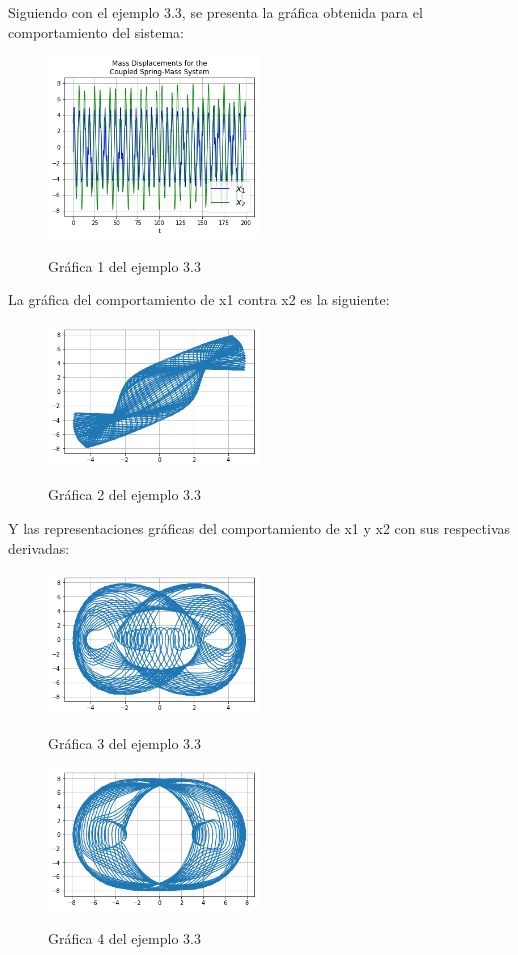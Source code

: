 \documentclass{article}
\begin{document}
Siguiendo con el ejemplo 3.3, se presenta la gráfica obtenida para el comportamiento del sistema:
\begin{figure}[H]
    \caption{Gráfica 1 del ejemplo 3.3}
    \includegraphics[width=0.5\textwidth]{Grafica22.png}
    \centering
    \label{Cod}
\end{figure}
La gráfica del comportamiento de x1 contra  x2 es la siguiente:
\begin{figure}[H]
    \caption{Gráfica 2 del ejemplo 3.3}
    \includegraphics[width=0.5\textwidth]{Grafica23.png}
    \centering
    \label{Cod}
\end{figure}
Y las representaciones gráficas del comportamiento de x1 y x2 con sus respectivas derivadas:
\begin{figure}[H]
    \caption{Gráfica 3 del ejemplo 3.3}
    \includegraphics[width=0.5\textwidth]{Grafica24.png}
    \centering
    \label{Cod}
\end{figure}
\begin{figure}[H]
    \caption{Gráfica 4 del ejemplo 3.3}
    \includegraphics[width=0.5\textwidth]{Grafica25.png}
    \centering
    \label{Cod}
\end{figure}
\end{document}
